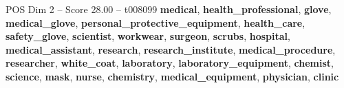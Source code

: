\begin{textsample}{POS Dim 2 – Score 28.00 – t008099}  \label{ex:f2_pos_037}
\textbf{medical}, \textbf{health\_professional}, \textbf{glove}, \textbf{medical\_glove}, \textbf{personal\_protective\_equipment}, \textbf{health\_care}, \textbf{safety\_glove}, \textbf{scientist}, \textbf{workwear}, \textbf{surgeon}, \textbf{scrubs}, \textbf{hospital}, \textbf{medical\_assistant}, \textbf{research}, \textbf{research\_institute}, \textbf{medical\_procedure}, \textbf{researcher}, \textbf{white\_coat}, \textbf{laboratory}, \textbf{laboratory\_equipment}, \textbf{chemist}, \textbf{science}, \textbf{mask}, \textbf{nurse}, \textbf{chemistry}, \textbf{medical\_equipment}, \textbf{physician}, \textbf{clinic}

\end{textsample}
